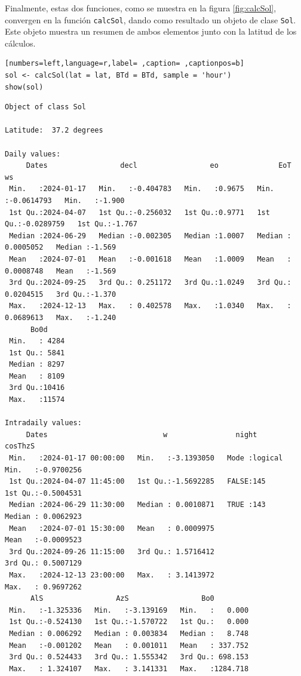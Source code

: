 Finalmente, estas dos funciones, como se muestra en la figura \ref{fig:calcSol}, convergen en la función \texttt{calcSol}, dando como resultado un objeto de clase \texttt{Sol}. Este objeto muestra un resumen de ambos elementos junto con la latitud de los cálculos.
\begin{lstlisting}[numbers=left,language=r,label= ,caption= ,captionpos=b]
sol <- calcSol(lat = lat, BTd = BTd, sample = 'hour')
show(sol)
\end{lstlisting}

\begin{verbatim}
Object of class Sol 

Latitude:  37.2 degrees

Daily values:
     Dates                 decl                 eo              EoT                   ws        
 Min.   :2024-01-17   Min.   :-0.404783   Min.   :0.9675   Min.   :-0.0614793   Min.   :-1.900  
 1st Qu.:2024-04-07   1st Qu.:-0.256032   1st Qu.:0.9771   1st Qu.:-0.0289759   1st Qu.:-1.767  
 Median :2024-06-29   Median :-0.002305   Median :1.0007   Median : 0.0005052   Median :-1.569  
 Mean   :2024-07-01   Mean   :-0.001618   Mean   :1.0009   Mean   : 0.0008748   Mean   :-1.569  
 3rd Qu.:2024-09-25   3rd Qu.: 0.251172   3rd Qu.:1.0249   3rd Qu.: 0.0204515   3rd Qu.:-1.370  
 Max.   :2024-12-13   Max.   : 0.402578   Max.   :1.0340   Max.   : 0.0689613   Max.   :-1.240  
      Bo0d      
 Min.   : 4284  
 1st Qu.: 5841  
 Median : 8297  
 Mean   : 8109  
 3rd Qu.:10416  
 Max.   :11574  

Intradaily values: 
     Dates                           w                night            cosThzS          
 Min.   :2024-01-17 00:00:00   Min.   :-3.1393050   Mode :logical   Min.   :-0.9700256  
 1st Qu.:2024-04-07 11:45:00   1st Qu.:-1.5692285   FALSE:145       1st Qu.:-0.5004531  
 Median :2024-06-29 11:30:00   Median : 0.0010871   TRUE :143       Median : 0.0062923  
 Mean   :2024-07-01 15:30:00   Mean   : 0.0009975                   Mean   :-0.0009523  
 3rd Qu.:2024-09-26 11:15:00   3rd Qu.: 1.5716412                   3rd Qu.: 0.5007129  
 Max.   :2024-12-13 23:00:00   Max.   : 3.1413972                   Max.   : 0.9697262  
      AlS                 AzS                 Bo0          
 Min.   :-1.325336   Min.   :-3.139169   Min.   :   0.000  
 1st Qu.:-0.524130   1st Qu.:-1.570722   1st Qu.:   0.000  
 Median : 0.006292   Median : 0.003834   Median :   8.748  
 Mean   :-0.001202   Mean   : 0.001011   Mean   : 337.752  
 3rd Qu.: 0.524433   3rd Qu.: 1.555342   3rd Qu.: 698.153  
 Max.   : 1.324107   Max.   : 3.141331   Max.   :1284.718
\end{verbatim}

